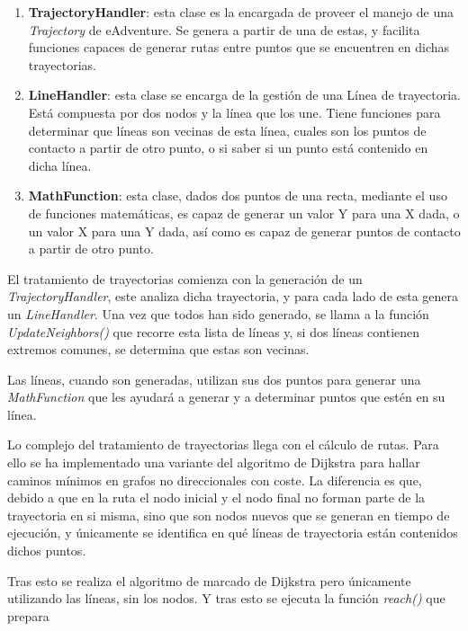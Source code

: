 \begin{enumerate}
	\item \textbf{TrajectoryHandler}: esta clase es la encargada de proveer el manejo de una \textit{Trajectory} de eAdventure. Se genera a partir de una de estas, y facilita funciones capaces de generar rutas entre puntos que se encuentren en dichas trayectorias.
	
	\item \textbf{LineHandler}: esta clase se encarga de la gestión de una Línea de trayectoria. Está compuesta por dos nodos y la línea que los une. Tiene funciones para determinar que líneas son vecinas de esta línea, cuales son los puntos de contacto a partir de otro punto, o si saber si un punto está contenido en dicha línea.
	
	\item \textbf{MathFunction}: esta clase, dados dos puntos de una recta, mediante el uso de funciones matemáticas, es capaz de generar un valor Y para una X dada, o un valor X para una Y dada, así como es capaz de generar puntos de contacto a partir de otro punto.
\end{enumerate}

El tratamiento de trayectorias comienza con la generación de un \textit{TrajectoryHandler}, este analiza dicha trayectoria, y para cada lado de esta genera un \textit{LineHandler}. Una vez que todos han sido generado, se llama a la función \textit{UpdateNeighbors()} que recorre esta lista de líneas y, si dos líneas contienen extremos comunes, se determina que estas son vecinas.

Las líneas, cuando son generadas, utilizan sus dos puntos para generar una \textit{MathFunction} que les ayudará a generar y a determinar puntos que estén en su línea.

Lo complejo del tratamiento de trayectorias llega con el cálculo de rutas. Para ello se ha implementado una variante del algoritmo de Dijkstra para hallar caminos mínimos en grafos no direccionales con coste. La diferencia es que, debido a que en la ruta el nodo inicial y el nodo final no forman parte de la trayectoria en si misma, sino que son nodos nuevos que se generan en tiempo de ejecución, y únicamente se identifica en qué líneas de trayectoria están contenidos dichos puntos.

Tras esto se realiza el algoritmo de marcado de Dijkstra pero únicamente utilizando las líneas, sin los nodos. Y tras esto se ejecuta la función \textit{reach()} que prepara 

